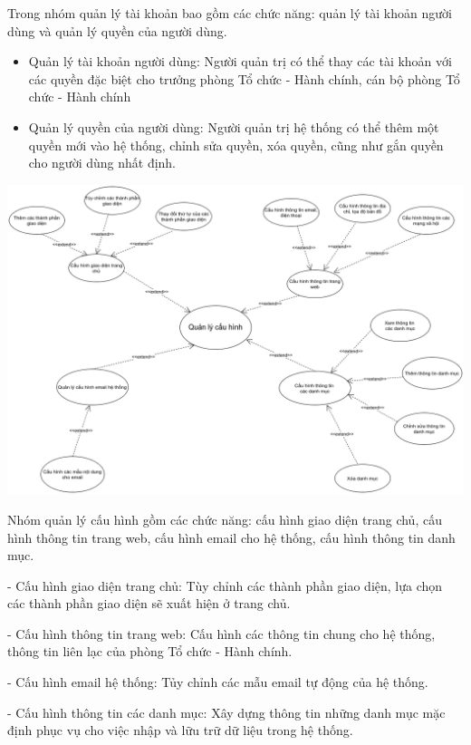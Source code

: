 Trong nhóm quản lý tài khoản bao gồm các chức năng: quản lý tài khoản người dùng và quản lý quyền của người dùng.
\begin{itemize}
    \item Quản lý tài khoản người dùng:
        \subitem Người quản trị có thể thay các tài khoản với các quyền đặc biệt cho trưởng phòng Tổ chức - Hành chính, cán bộ phòng Tổ chức - Hành chính
    \item Quản lý quyền của người dùng:
        \subitem Người quản trị hệ thống có thể thêm một quyền mới vào hệ thống, chỉnh sửa quyền, xóa quyền, cũng như gắn quyền cho người dùng nhất định.
\end{itemize}

\begin{center}
  \captionsetup{type=figure}
  \includegraphics[scale=0.4]{img/UML/Admin/quanlycauhinh.png}
\end{center}

Nhóm quản lý cấu hình gồm các chức năng: cấu hình giao diện trang chủ, cấu hình thông tin trang web, cấu hình email cho hệ thống, cấu hình thông tin danh mục.

- Cấu hình giao diện trang chủ: Tùy chỉnh các thành phần giao diện, lựa chọn các thành phần giao diện sẽ xuất hiện ở trang chủ.

- Cấu hình thông tin trang web: Cấu hình các thông tin chung cho hệ thống, thông tin liên lạc của phòng Tổ chức - Hành chính.

- Cấu hình email hệ thống: Tủy chỉnh các mẫu email tự động của hệ thống.

- Cấu hình thông tin các danh mục: Xây dựng thông tin những danh mục mặc định phục vụ cho việc nhập và lữu trữ dữ liệu trong hệ thống.
